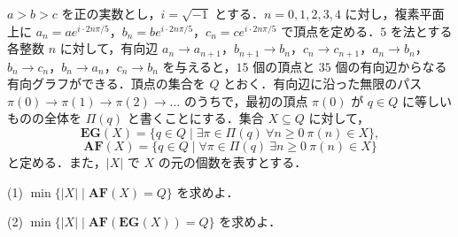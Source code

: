 \documentclass[12pt]{jlreq}
\begin{document}
\(a > b > c\) を正の実数とし，\(i = \sqrt{-1}\) とする．\(n = 0, 1, 2, 3, 4\) に対し，複素平面上に \(a_n = a e^{i \cdot 2n\pi/5}\)，\(b_n = b e^{i \cdot 2n\pi/5}\)，\(c_n = c e^{i \cdot 2n\pi/5}\) で頂点を定める．\(5\) を法とする各整数 \(n\) に対して，有向辺 \(a_n \to a_{n+1}\)，\(b_{n+1} \to b_n\)，\(c_n \to c_{n+1}\)，\(a_n \to b_n\)，\(b_n \to c_n\)，\(b_n \to a_n\)，\(c_n \to b_n\) を与えると，\(15\) 個の頂点と \(35\) 個の有向辺からなる有向グラフができる．頂点の集合を \(Q\) とおく．有向辺に沿った無限のパス \(\pi(0) \to \pi(1) \to \pi(2) \to \dots\) のうちで，最初の頂点 \(\pi(0)\) が \(q \in Q\) に等しいものの全体を \(\Pi(q)\) と書くことにする．集合 \(X \subseteq Q\) に対して，
\[
  \mathbf{EG}(X) = \{ q \in Q \mid \exists\pi\in\Pi(q)\ \forall n \ge 0\ \pi(n) \in X \},
\]
\[
  \mathbf{AF}(X) = \{ q \in Q \mid \forall\pi\in\Pi(q)\ \exists n \ge 0\ \pi(n) \in X \}
\]
と定める．また，\(|X|\) で \(X\) の元の個数を表すとする．

(1) \(\min \{ |X| \mid \mathbf{AF}(X) = Q \}\) を求めよ．

(2) \(\min \{ |X| \mid \mathbf{AF}(\mathbf{EG}(X)) = Q \}\) を求めよ．
\end{document}
